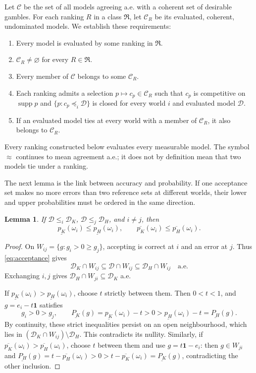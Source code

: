 \documentclass[11pt]{article}
\newtheorem{lemma}[theorem]{Lemma}
\theoremstyle{remark}
\newcommand{\one}{\mathbf 1}
\newcommand{\supp}{\operatorname{supp}}
\newcommand{\Dscr}{\mathcal D}
\newcommand{\lpr}[1]{\underline{P_{#1}}}
\newcommand{\lowprob}[1]{\underline{p_{#1}}}
\newcommand{\upprob}[1]{\overline{p_{#1}}}
\begin{document}
Let $\mathcal C$ be the set of all models agreeing a.e. with a coherent set of
desirable gambles. For each ranking $R$ in a class $\mathfrak R$, let
$\mathcal C_R$ be its evaluated, coherent, undominated models. We establish
these requirements:
\begin{enumerate}[leftmargin=*,itemsep=2pt]
\item[\textbf{(E)}] Every model is evaluated by some ranking in $\mathfrak R$.
\item[\textbf{(LA)}] $\mathcal C_R\ne\varnothing$ for every $R\in\mathfrak R$.
\item[\textbf{(A)}] Every member of $\mathcal C$ belongs to some $\mathcal C_R$.
\item[\textbf{(S)}] Each ranking admits a selection $p\mapsto c_p\in\mathcal C_R$
such that $c_p$ is competitive on $\supp p$ and
$\{p:c_p\preceq_i\Dscr\}$ is closed for every world $i$ and evaluated model $\Dscr$.
\item[\textbf{(C)}] If an evaluated model ties at every world with a member of
$\mathcal C_R$, it also belongs to $\mathcal C_R$.
\end{enumerate}
Every ranking constructed below evaluates every measurable model. The symbol
$\approx$ continues to mean agreement a.e.; it does not by definition mean
that two models tie under a ranking.

The next lemma is the link between accuracy and probability. If one acceptance
set makes no more errors than two reference sets at different worlds, their
lower and upper probabilities must be ordered in the same direction.

\begin{lemma}\label{lem:endpoints}
If $\Dscr\le_i\Dscr_{K}$, $\Dscr\le_j\Dscr_{H}$, and $i\ne j$, then
\begin{equation}
 \lowprob{K}(\omega_i)\le\lowprob{H}(\omega_i),\qquad \upprob{K}(\omega_i)\le\upprob{H}(\omega_i).\label{eq:endpoints}
\end{equation}
\end{lemma}
\begin{proof}
On $W_{ij}=\{g:g_i>0\ge g_j\}$, accepting is correct at $i$ and an error at
$j$. Thus \eqref{eq:acceptance} gives
\[
 \Dscr_{K}\cap W_{ij}\subseteq \Dscr\cap W_{ij}\subseteq \Dscr_{H}\cap W_{ij}
 \quad\text{a.e.}
\]
Exchanging $i,j$ gives $\Dscr_{H}\cap W_{ji}\subseteq \Dscr_{K}$ a.e.

If $\lowprob{K}(\omega_i)>\lowprob{H}(\omega_i)$, choose $t$ strictly between them. Then $0<t<1$, and
$g=e_i-t\one$ satisfies
\[
 g_i>0>g_j,\qquad
 \lpr{K}(g)=\lowprob{K}(\omega_i)-t>0>\lowprob{H}(\omega_i)-t=\lpr{H}(g).
\]
By continuity, these strict inequalities persist on an open neighbourhood,
which lies in $(\Dscr_{K}\cap W_{ij})\setminus \Dscr_{H}$. This contradicts its nullity.
Similarly, if $\upprob{K}(\omega_i)>\upprob{H}(\omega_i)$, choose $t$ between them and use
$g=t\one-e_i$: then $g\in W_{ji}$ and
$\lpr{H}(g)=t-\upprob{H}(\omega_i)>0>t-\upprob{K}(\omega_i)=\lpr{K}(g)$, contradicting the
other inclusion.
\end{proof}
\end{document}
